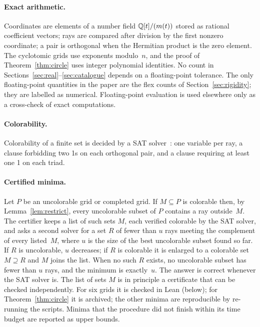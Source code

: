 \paragraph{Exact arithmetic.}  Coordinates are elements of a number field $\mathbb{Q}[t]/(m(t))$ stored
as rational coefficient vectors; rays are compared after division by the first nonzero
coordinate; a pair is orthogonal when the Hermitian product is the zero element.  The
cyclotomic grids use exponents modulo~$n$, and the proof of Theorem~\ref{thm:circle} uses
integer polynomial identities.  No count in Sections~\ref{sec:real}--\ref{sec:catalogue} depends
on a floating-point tolerance.  The only floating-point quantities in the paper are the flex
counts of Section~\ref{sec:rigidity}; they are labelled as numerical.  Floating-point
evaluation is used elsewhere only as a cross-check of exact computations.

\paragraph{Colorability.}  Colorability of a finite set is decided by a SAT
solver~\cite{AudemardSimon2018}: one variable per ray, a clause forbidding two 1s on each
orthogonal pair, and a clause requiring at least one 1 on each triad.

\paragraph{Certified minima.}  Let $P$ be an uncolorable grid or completed grid.  If $M\subseteq P$ is colorable
then, by Lemma~\ref{lem:restrict}, every uncolorable subset of $P$ contains a ray outside~$M$.
The certifier keeps a list of such sets $M$, each verified colorable by the SAT solver, and asks
a second solver for a set $R$ of fewer than $u$ rays meeting the complement of every listed~$M$,
where $u$ is the size of the best uncolorable subset found so far.  If $R$ is uncolorable, $u$
decreases; if $R$ is colorable it is enlarged to a colorable set $M\supseteq R$ and $M$ joins the
list.  When no such $R$ exists, no uncolorable subset has fewer than $u$ rays, and the minimum is
exactly~$u$.  The answer is correct whenever the SAT solver is.  The list of sets $M$ is in principle a
certificate that can be checked independently.  For six grids it is checked in Lean (below);
for Theorem~\ref{thm:circle} it is archived; the other minima are reproducible by re-running
the scripts.  Minima that the procedure did not finish within
its time budget are reported as upper bounds.

